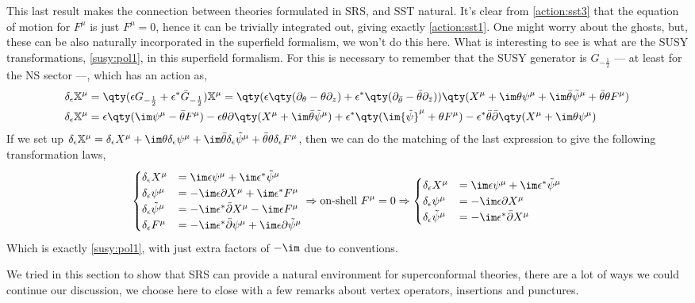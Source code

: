 This last result makes the connection between theories formulated in SRS, and SST natural. It's clear from \cref{action:sst3} that the 
equation of motion for $F^\mu$ is just $F^\mu=0$, hence it can be trivially integrated out, giving exactly \cref{action:sst1}. One might 
worry about the ghosts, but, these can be also naturally incorporated in the superfield formalism, we won't do this here. What is interesting to 
see is what are the SUSY transformations, \cref{susy:pol1}, in this superfield formalism. For this is necessary to remember that 
the SUSY generator is $G_{-\frac12}$ --- at least for the NS sector ---, which has an action as,
\begin{align*}
    \delta_\epsilon\mathbb X^\mu&=\qty(\epsilon G_{-\frac12}+\epsilon^\ast \bar G_{-\frac12})\mathbb X^\mu=\qty(\epsilon\qty(\partial_\theta-\theta\partial_z)+\epsilon^\ast\qty(\partial_{\bar\theta}-\bar\theta\partial_{\bar z}))\qty(X^\mu+\im\theta\psi^\mu+\im\bar\theta{\tilde\psi}^\mu+\bar\theta\theta F^\mu)\\
    \delta_\epsilon\mathbb X^\mu&=\epsilon\qty(\im\psi^\mu-\bar\theta F^\mu)-\epsilon\theta\partial\qty(X^\mu+\im\bar\theta{\tilde\psi}^\mu)+\epsilon^\ast\qty(\im{\tilde\psi}^\mu+\theta F^\mu)-\epsilon^\ast\bar\theta\bar\partial\qty(X^\mu+\im\theta{\psi}^\mu)
\end{align*}
If we set up $\delta_\epsilon\mathbb X^\mu=\delta_\epsilon X^\mu+\im\theta\delta_\epsilon\psi^\mu+\im\bar\theta\delta_\epsilon{\tilde\psi}^\mu+\bar\theta\theta\delta_\epsilon F^\mu$, then we can do the matching of the last expression to 
give the following transformation laws,
\begin{align*}\begin{cases}
    \delta_\epsilon X^\mu&=\im\epsilon\psi^\mu+\im\epsilon^\ast{\tilde\psi}^\mu\\
    \delta_\epsilon \psi^\mu&=-\im\epsilon\partial X^\mu+\im\epsilon^\ast F^\mu\\
    \delta_\epsilon {\tilde\psi}^\mu&=-\im\epsilon^\ast\bar\partial X^\mu-\im\epsilon F^\mu\\
    \delta_\epsilon F^\mu&=-\im\epsilon^\ast\bar\partial\psi^\mu+\im\epsilon\partial{\tilde\psi}^\mu\end{cases}\Rightarrow \textnormal{on-shell }F^\mu=0\Rightarrow\begin{cases}
    \delta_\epsilon X^\mu&=\im\epsilon\psi^\mu+\im\epsilon^\ast{\tilde\psi}^\mu\\
    \delta_\epsilon \psi^\mu&=-\im\epsilon\partial X^\mu\\
    \delta_\epsilon {\tilde\psi}^\mu&=-\im\epsilon^\ast\bar\partial X^\mu\end{cases}
\end{align*}
Which is exactly \cref{susy:pol1}, with just extra factors of $-\im$ due to conventions. 

We tried 
in this section to show that SRS can provide a natural environment for superconformal theories, there are a 
lot of ways we could continue our discussion, we choose here to close with a few remarks about 
vertex operators, insertions and punctures.